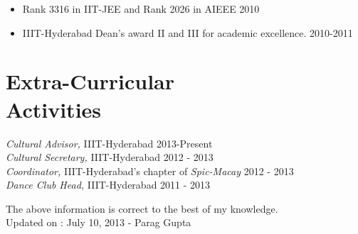 \documentclass[margin]{res}
\begin{document}
\begin{resume}
\begin{itemize}
\item Rank 3316 in IIT-JEE and Rank 2026 in AIEEE \hfill{2010}
\item IIIT-Hyderabad Dean's award II and III for academic excellence. \hfill{2010-2011} 
\end{itemize}



\section{Extra-Curricular \\ Activities}
{\it Cultural Advisor,} IIIT-Hyderabad \hfill{2013-Present} \\
{\it Cultural Secretary,} IIIT-Hyderabad  \hfill{2012 - 2013} \\
{\it Coordinator,} IIIT-Hyderabad's chapter of {\it Spic-Macay} \hfill{2012 - 2013} \\
{\it Dance Club Head,} IIIT-Hyderabad \hfill{2011 - 2013}
            
\noindent The above information is correct to the best of my knowledge.\\
Updated on : July 10, 2013 \hfill{- Parag Gupta} 


\end{resume}
\end{document}
